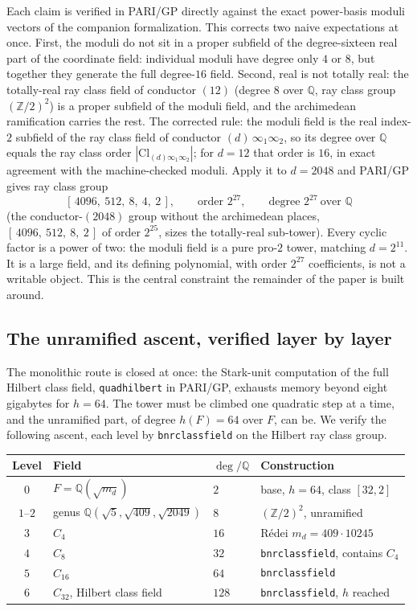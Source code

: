 \documentclass[12pt,a4paper]{article}
\newcommand{\Fd}{F}
\newcommand{\md}{m_d}
\begin{document}
Each claim is verified in PARI/GP directly against the exact power-basis moduli
vectors of the companion formalization.  This corrects two naive expectations at
once.  First, the moduli do not sit in a proper subfield of the degree-sixteen
real part of the coordinate field: individual moduli have degree only $4$ or
$8$, but together they generate the full degree-$16$ field.  Second, real is
not totally real: the totally-real ray class field of conductor $(12)$ (degree
$8$ over $\mathbb{Q}$, ray class group $(\mathbb{Z}/2)^2$) is a proper subfield
of the moduli field, and the archimedean ramification carries the rest.  The
corrected rule: the moduli field is the real index-$2$ subfield of the ray
class field of conductor $(d)\,\infty_1\infty_2$, so its degree over
$\mathbb{Q}$ equals the ray class order $|\mathrm{Cl}_{(d)\infty_1\infty_2}|$;
for $d=12$ that order is $16$, in exact agreement with the machine-checked
moduli.  Apply it to $d=2048$ and PARI/GP gives ray class group
\[
[\,4096,\ 512,\ 8,\ 4,\ 2\,],\qquad \text{order } 2^{27},
\qquad \text{degree } 2^{27}\ \text{over }\mathbb{Q}
\]
(the conductor-$(2048)$ group without the archimedean places,
$[\,4096,\ 512,\ 8,\ 2\,]$ of order $2^{25}$, sizes the totally-real
sub-tower).  Every cyclic factor is a power of two: the moduli field is a pure
pro-$2$ tower, matching $d=2^{11}$.  It is a large field, and its defining
polynomial, with order $2^{27}$ coefficients, is not a writable object.  This
is the central constraint the remainder of the paper is built around.

\subsection{The unramified ascent, verified layer by layer}

The monolithic route is closed at once: the Stark-unit computation of the full
Hilbert class field, \texttt{quadhilbert} in PARI/GP, exhausts memory beyond
eight gigabytes for $h=64$.  The tower must be climbed one quadratic step at a
time, and the unramified part, of degree $h(\Fd)=64$ over $\Fd$, can be.  We
verify the following ascent, each level by \texttt{bnrclassfield} on the Hilbert
ray class group.

\begin{center}
\begin{tabular}{@{}clll@{}}
\toprule
Level & Field & $\deg/\mathbb{Q}$ & Construction \\
\midrule
$0$ & $\Fd = \mathbb{Q}(\sqrt{\md})$ & $2$ & base, $h=64$, class $[32,2]$ \\
$1$--$2$ & genus $\mathbb{Q}(\sqrt5,\sqrt{409},\sqrt{2049})$ & $8$ & $(\mathbb{Z}/2)^2$, unramified \\
$3$ & $C_4$ & $16$ & R\'edei $\md = 409\cdot 10245$ \\
$4$ & $C_8$ & $32$ & \texttt{bnrclassfield}, contains $C_4$ \\
$5$ & $C_{16}$ & $64$ & \texttt{bnrclassfield} \\
$6$ & $C_{32}$, Hilbert class field & $128$ & \texttt{bnrclassfield}, $h$ reached \\
\bottomrule
\end{tabular}
\end{center}
\end{document}
